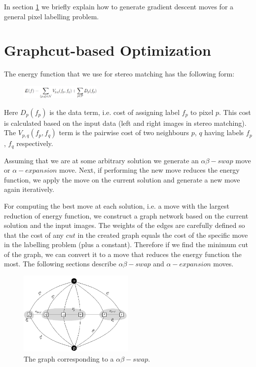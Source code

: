 \documentclass[letterpaper, 10 pt, conference]{ieeeconf}  %
\begin{document}
In section \ref{graphcut} we briefly explain how to generate gradient descent moves for a general pixel labelling problem.

\section{Graphcut-based Optimization}
\label{graphcut}
The energy function that we use for stereo matching has the following form:
\begin{figure}[h]
                \centering
                \includegraphics[width=0.35\textwidth]{imgs/energy.png}
                \label{fig:farm}
\end{figure}

Here $D_p(f_p)$ is the data term, i.e. cost of assigning label $f_p$ to pixel $p$. This cost is calculated based on the input data (left and right images in stereo matching). The $V_{p,q}(f_p,f_q)$ term is the pairwise cost of two neighbours $p$, $q$ having labels $f_p$, $f_q$ respectively. 

Assuming that we are at some arbitrary solution we generate an $\alpha\beta-swap$ move or $\alpha-expansion$ move. Next, if performing the new move reduces the energy function, we apply the move on the current solution and generate a new move again iteratively. 

For computing the best move at each solution, i.e. a move with the largest reduction of energy function, we construct a graph network based on the current solution and the input images. The weights of the edges are carefully defined so that the cost of any $cut$ in the created graph equals the cost of the specific move in the labelling problem (plus a constant). Therefore if we find the minimum cut of the graph, we can convert it to a move that reduces the energy function the most.  The following sections describe $\alpha\beta-swap$ and $\alpha-expansion$ moves.

\begin{figure}[h]
                \centering
                \includegraphics[width=0.5\textwidth]{imgs/swap.png}
                \caption{The graph corresponding to a $\alpha\beta-swap$.}
                \label{abswap}
\end{figure}
\end{document}
